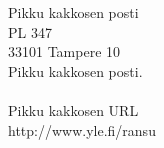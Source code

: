 
Pikku kakkosen posti \\ PL 347 \\ 33101 Tampere 10 \\ Pikku kakkosen posti. \\ \hspace{10mm} \\ Pikku kakkosen URL \\ http://www.yle.fi/{\raisebox{0.5ex}\texttildelow}ransu